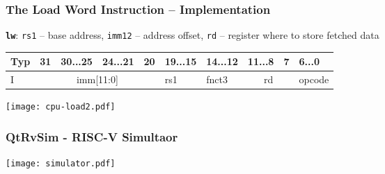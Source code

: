 \documentclass{beamer}
\begin{document}
\begin{frame}[shrink=15]
\frametitle{The Load Word Instruction -- Implementation}

\textbf{\texttt{lw}}: \texttt{rs1} -- base address, \texttt{imm12} -- address offset, \texttt{rd} -- register where to store fetched data

\bigskip

\begin{table}
\footnotesize
\begin{tabular}{|m{0.4cm}|m{0.4cm}|m{1.0cm}|m{1.0cm}|m{0.4cm}|m{1.0cm}|m{1.0cm}|m{1.0cm}|m{0.4cm}|m{1.0cm}|}\hline
Typ & 31 & 30...25 & 24...21 & 20 & 19...15 & 14...12 & 11...8 & 7 & 6...0 \\ \hline
I & \multicolumn{4}{c|}{ imm[11:0] } & rs1 & fnct3 &\multicolumn{2}{c|}{ rd } & opcode\\ \hline
\end{tabular}
\end{table}

\bigskip

\begin{center}
\texttt{[image: cpu-load2.pdf]}
\end{center}
\end{frame}


\begin{frame}
\frametitle{QtRvSim - RISC-V Simultaor}

\texttt{[image: simulator.pdf]}

\end{frame}
\end{document}
